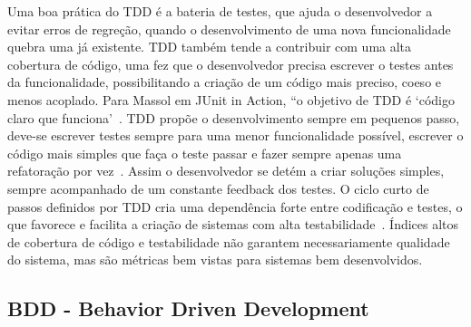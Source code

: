 Uma boa prática do TDD é a bateria de testes, que ajuda o desenvolvedor a evitar erros de regreção, quando o desenvolvimento de uma nova funcionalidade quebra uma já existente. TDD também tende a contribuir com uma alta cobertura de código, uma fez que o desenvolvedor precisa escrever o testes antes da funcionalidade, possibilitando a criação de um código mais preciso, coeso e menos acoplado. 
%
Para Massol em JUnit in Action, “o objetivo de TDD é ‘código claro que funciona’~\cite{massol2003}.
%
TDD propõe o desenvolvimento sempre em pequenos passo, deve-se escrever testes sempre para uma menor funcionalidade possível, escrever o código mais simples que faça o teste passar e fazer sempre apenas uma refatoração por vez~\cite{beck2002}. Assim o desenvolvedor se detém a criar soluções simples, sempre acompanhado de um constante feedback dos testes.
%
O ciclo curto de passos definidos por TDD cria uma dependência forte entre codificação e testes, o que favorece e facilita a criação de sistemas com alta testabilidade~\cite{bernardo2011}. Índices altos de cobertura de código e testabilidade não garantem necessariamente qualidade do sistema, mas são métricas bem vistas para sistemas bem desenvolvidos.

\subsection{BDD - Behavior Driven Development}


